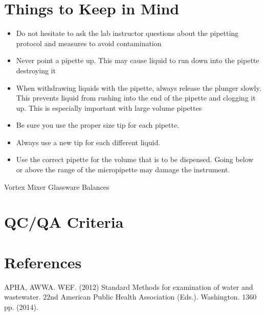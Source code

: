 \documentclass[12pt]{../SOP3_alpha}
\begin{document}
\section{Things to Keep in Mind}
\begin{itemize}
  \item Do not hesitate to ask the lab instructor questions about the pipetting protocol and measures to avoid contamination 
\item Never point a pipette up. This may cause liquid to run down into the pipette destroying it
\item When withdrawing liquids with the pipette, always release the plunger slowly. This prevents liquid from rushing into the end of the pipette and clogging it up.  This is especially important with large volume pipettes 
\item Be sure you use the proper size tip for each pipette. 
\item Always use a new tip for each different liquid.
\item Use the correct pipette for the volume that is to be dispensed. Going below or above the range of the micropipette may damage the instrument.      

\end{itemize}


\NP Vortex Mixer
\NP Glassware
\NP Balances 



\section{QC/QA Criteria}

\section{References}

\NP APHA, AWWA. WEF. (2012) Standard Methods for examination of water and wastewater. 22nd American Public Health Association (Eds.). Washington. 1360 pp. (2014).
\end{document}
